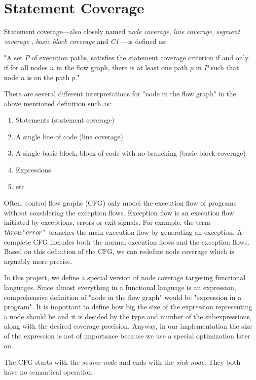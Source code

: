 \documentclass[12pt,a4paper]{report}
\begin{document}
\section{Statement Coverage}
Statement coverage---also closely named \emph{node coverage}, \emph{line coverage}, \emph{segment coverage} \cite{Ntafos:1988:CST:630792.631017}, \emph{basic block coverage} and \emph{C1} \cite{beizer2002software}---is defined as: 

"A set $P$ of execution paths, satisfies the statement coverage criterion if and only if for all nodes $n$ in the flow graph, there is at least one path $p$ in $P$ such that node $n$ is on the path $p$."\cite{Zhu:1997:SUT:267580.267590}

There are several different interpretations for "node in the flow graph" in the above mentioned definition such as:

\begin{enumerate}
 \item Statements (statement coverage)
 \item A single line of code (line coverage)
 \item A single basic block; block of code with no branching (basic block coverage)
 \item Expressions 
 \item etc
\end{enumerate}

Often, control flow graphs (CFG) only model the execution flow of programs without considering the exception flows. Exception flow is an execution flow initiated by exceptions, errors or exit signals. For example, the term $throw "error"$  branches the main execution flow by generating an exception. A complete CFG includes both the normal execution flows and the exception flows. Based on this definition of the CFG, we can redefine node coverage which is arguably more precise.

In this project, we define a special version of node coverage targeting functional languages. Since almost everything in a functional language is an expression, comprehensive definition of "node in the flow graph" would be "expression in a program". It is important to define how big the size of the expression representing a node should be and it is decided by the type and number of the subexpressions, along with the desired coverage precision. Anyway, in our implementation the size of the expression is not of importance because we use a special optimization later on.   

The CFG starts with the \emph{source node} and ends with the \emph{sink node}. They both have no semantical operation.
\end{document}
